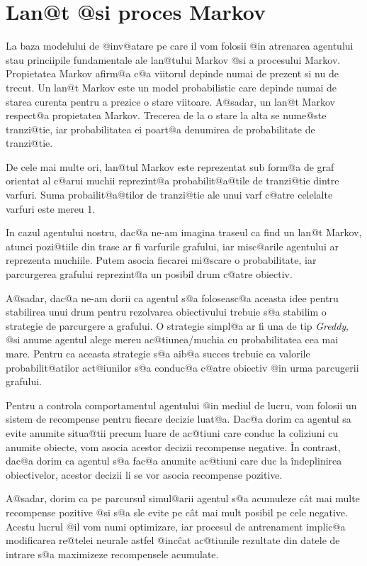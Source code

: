 \section{Lan@t @si proces Markov}


La baza modelului de @inv@atare pe care il vom folosii @in atrenarea agentului stau princiipile fundamentale ale lan@tului Markov @si a procesului Markov.
Propietatea Markov afirm@a c@a viitorul depinde numai de prezent si nu de trecut. Un lan@t Markov este un model probabilistic care depinde numai de starea curenta pentru a prezice o stare viitoare. A@sadar, un lan@t Markov respect@a propietatea Markov.
Trecerea de la o stare la alta se nume@ste tranzi@tie, iar probabilitatea ei poart@a denumirea de probabilitate de tranzi@tie.

De cele mai multe ori, lan@tul Markov este reprezentat sub form@a de graf orientat al c@arui muchii reprezint@a probabilit@a@tile de tranzi@tie dintre varfuri. Suma probailit@a@tilor de tranzi@tie ale unui varf c@atre celelalte varfuri este mereu 1.

In cazul agentului nostru, dac@a ne-am imagina traseul ca find un lan@t Markov, atunci pozi@tiile din trase ar fi varfurile grafului, iar misc@arile agentului ar reprezenta muchiile. Putem asocia fiecarei mi@scare o probabilitate, iar parcurgerea grafului reprezint@a un posibil drum c@atre obiectiv.

A@sadar, dac@a ne-am dorii ca agentul s@a foloseasc@a aceasta idee pentru stabilirea unui drum pentru rezolvarea obiectivului trebuie s@a stabilim o strategie de parcurgere a grafului.
O strategie simpl@a ar fi una de tip {\sl Greddy}, @si anume agentul alege mereu ac@tiunea/muchia cu probabilitatea cea mai mare. Pentru ca aceasta strategie s@a aib@a succes trebuie ca valorile probabilit@atilor act@iunilor s@a conduc@a c@atre obiectiv @in urma parcugerii grafului.

Pentru a controla comportamentul agentului @in mediul de lucru, vom folosii un sistem de recompense pentru fiecare decizie luat@a. Dac@a dorim ca agentul sa evite anumite situa@tii precum luare de ac@tiuni care conduc la coliziuni cu anumite obiecte, vom asocia acestor decizii recompense negative. \^In contrast, dac@a dorim ca agentul s@a fac@a anumite ac@tiuni care duc la \^indeplinirea obiectivelor, acestor decizii li se vor asocia recompense pozitive.

A@sadar, dorim ca pe parcursul simul@arii agentul s@a acumuleze c\^ at mai multe recompense pozitive @si s@a sle evite pe c\^ at mai mult posibil pe cele negative. Acestu lucrul @il vom numi optimizare, iar procesul de antrenament implic@a modificarea re@telei neurale astfel @inc\^ cat ac@tiunile rezultate din datele de intrare s@a maximizeze recompensele acumulate.

